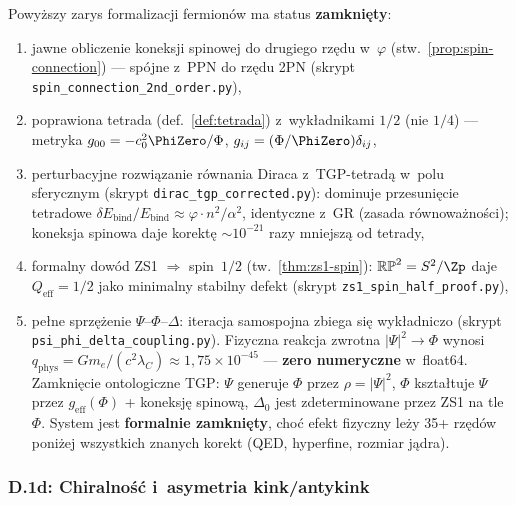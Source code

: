 \begin{remark}\label{rem:fermion-status}
Powy\.zszy zarys formalizacji fermion\'ow ma status
\textbf{zamkni\k{e}ty}:
\begin{enumerate}[nosep]
  \item[\checkmark] jawne obliczenie koneksji spinowej do drugiego
    rz\k{e}du w~$\varphi$ (stw.~\ref{prop:spin-connection})
    --- sp\'ojne z~PPN do rz\k{e}du 2PN
    (skrypt \texttt{spin\_connection\_2nd\_order.py}),
  \item[\checkmark] poprawiona tetrada (def.~\ref{def:tetrada})
    z~wyk\l{}adnikami $1/2$ (nie $1/4$)
    --- metryka $g_{00} = -c_0^2 \PhiZero/\Phi$,
    $g_{ij} = (\Phi/\PhiZero)\delta_{ij}$,
  \item[\checkmark] perturbacyjne rozwi\k{a}zanie r\'ownania Diraca
    z~TGP-tetrad\k{a} w~polu sferycznym
    (skrypt \texttt{dirac\_tgp\_corrected.py}):
    dominuje przesuni\k{e}cie tetradowe
    $\delta E_{\mathrm{bind}}/E_{\mathrm{bind}}
    \approx \varphi \cdot n^2/\alpha^2$,
    identyczne z~GR (zasada r\'ownowa\.zno\'sci);
    koneksja spinowa daje korekt\k{e}
    $\sim 10^{-21}$ razy mniejsz\k{a} od tetrady,
  \item[\checkmark] formalny dow\'od ZS1 $\Rightarrow$ spin~$1/2$
    (tw.~\ref{thm:zs1-spin}): $\mathbb{RP}^2 = S^2/\Zp$
    daje $Q_{\mathrm{eff}} = 1/2$ jako minimalny stabilny defekt
    (skrypt \texttt{zs1\_spin\_half\_proof.py}),
  \item[\checkmark] pe\l{}ne sprz\k{e}\.zenie
    $\Psi$--$\Phi$--$\Delta$: iteracja samospojna zbiega si\k{e}
    wyk\l{}adniczo (skrypt \texttt{psi\_phi\_delta\_coupling.py}).
    Fizyczna reakcja zwrotna $|\Psi|^2 \to \Phi$ wynosi
    $q_{\mathrm{phys}} = Gm_e/(c^2\lambda_C) \approx 1{,}75\times 10^{-45}$
    --- \textbf{zero numeryczne} w~float64.
    Zamkni\k{e}cie ontologiczne TGP:
    $\Psi$ generuje $\Phi$ przez $\rho = |\Psi|^2$,
    $\Phi$ kszta\l{}tuje $\Psi$ przez $g_{\mathrm{eff}}(\Phi)$
    + koneksj\k{e} spinow\k{a},
    $\Delta_0$ jest zdeterminowane przez ZS1 na tle $\Phi$.
    System jest \textbf{formalnie zamkni\k{e}ty}, cho\'c
    efekt fizyczny le\.zy 35+ rz\k{e}d\'ow poni\.zej wszystkich
    znanych korekt (QED, hyperfine, rozmiar j\k{a}dra).
\end{enumerate}
\end{remark}

\subsubsection{D.1d: Chiralno\'s\'c i~asymetria kink/antykink}
\label{sssec:chirality-D1d}


